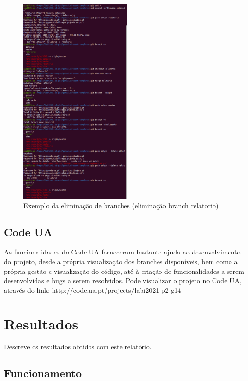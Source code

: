 \documentclass{report}
\begin{document}
\begin{figure}[!h]
\center 
\includegraphics[height=300pt]{img/git_2.png}
\caption{Exemplo da eliminação de branches (eliminação branch relatorio)}
\label{fig:git_d}
\end{figure}

\section{Code UA}
\label{sec:codeua}
As funcionalidades do Code UA forneceram bastante ajuda ao desenvolvimento do projeto, 
desde a própria visualização dos branches disponíveis, bem como a própria gestão e 
visualização do código, até à criação de funcionalidades a serem desenvolvidas e bugs 
a serem resolvidos. Pode visualizar o projeto no Code UA, através do 
link: http://code.ua.pt/projects/labi2021-p2-g14
\cite{codeua}


\chapter{Resultados}
\label{chap.resultados}
Descreve os resultados obtidos com este relatório.

\section{Funcionamento}
\label{sec:funcionamento}
\end{document}
